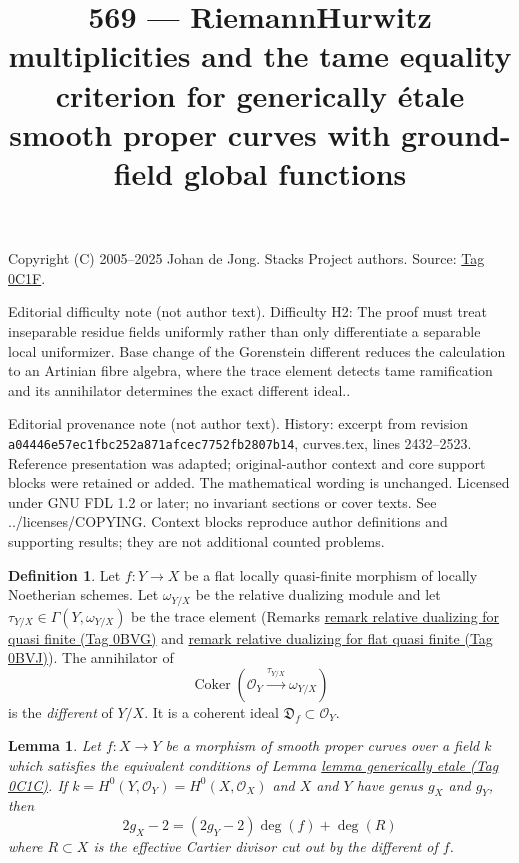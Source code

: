 \documentclass{amsart}
\theoremstyle{plain}
\newtheorem{lemma}[subsection]{Lemma}
\theoremstyle{definition}
\newtheorem{definition}[subsection]{Definition}
\theoremstyle{remark}
\numberwithin{equation}{subsection}
\def\Coker{\mathop{\mathrm{Coker}}}
\begin{document}
\title[Stacks Project, Tag 0C1F]{569 --- Riemann\textendash{}Hurwitz multiplicities and the tame equality criterion for generically étale smooth proper curves with ground-field global functions}
\maketitle
\noindent Copyright (C) 2005--2025 Johan de Jong. Stacks Project authors. Source: \href{https://stacks.math.columbia.edu/tag/0C1F}{Tag 0C1F}.

\noindent Editorial difficulty note (not author text). Difficulty H2: The proof must treat inseparable residue fields uniformly rather than only differentiate a separable local uniformizer. Base change of the Gorenstein different reduces the calculation to an Artinian fibre algebra, where the trace element detects tame ramification and its annihilator determines the exact different ideal..

\noindent Editorial provenance note (not author text). History: excerpt from revision \texttt{a0444\allowbreak 6e57e\allowbreak c1fbc\allowbreak 252a8\allowbreak 71afc\allowbreak ec775\allowbreak 2fb28\allowbreak 07b14}, curves.tex, lines 2432--2523. Reference presentation was adapted; original-author context and core support blocks were retained or added. The mathematical wording is unchanged. Licensed under GNU FDL 1.2 or later; no invariant sections or cover texts. See ../licenses/COPYING. Context blocks reproduce author definitions and supporting results; they are not additional counted problems.

\begin{definition}
\label{discriminant-definition-different}
Let $f : Y \to X$ be a flat locally quasi-finite morphism of
locally Noetherian schemes.
Let $\omega_{Y/X}$ be the relative dualizing module and let
$\tau_{Y/X} \in \Gamma(Y, \omega_{Y/X})$ be the trace element
(Remarks \href{https://stacks.math.columbia.edu/tag/0BVG}{remark relative dualizing for quasi finite (Tag 0BVG)} and
\href{https://stacks.math.columbia.edu/tag/0BVJ}{remark relative dualizing for flat quasi finite (Tag 0BVJ)}).
The annihilator of
$$
\Coker(\mathcal{O}_Y \xrightarrow{\tau_{Y/X}} \omega_{Y/X})
$$
is the {\it different} of $Y/X$. It is a coherent ideal
$\mathfrak{D}_f \subset \mathcal{O}_Y$.
\end{definition}

\begin{lemma}
\label{lemma-rh}
Let $f : X \to Y$ be a morphism of smooth proper curves
over a field $k$ which satisfies the equivalent conditions of
Lemma \href{https://stacks.math.columbia.edu/tag/0C1C}{lemma generically etale (Tag 0C1C)}. If
$k = H^0(Y, \mathcal{O}_Y) = H^0(X, \mathcal{O}_X)$
and $X$ and $Y$ have genus $g_X$ and $g_Y$, then
$$
2g_X - 2 = (2g_Y - 2) \deg(f) + \deg(R)
$$
where $R \subset X$ is the effective Cartier divisor cut out by
the different of $f$.
\end{lemma}
\end{document}
